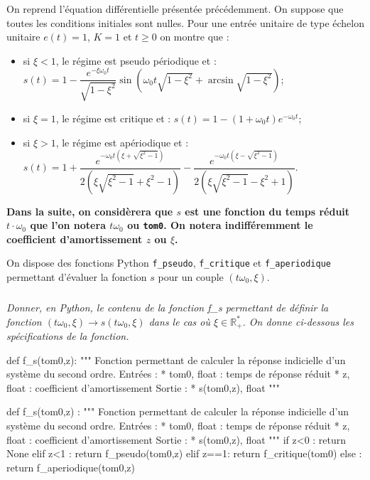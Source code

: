 \documentclass[10pt,fleqn]{article} %
\begin{document}
\ifprof
\else
On reprend l'équation différentielle présentée précédemment. On suppose que toutes les conditions initiales sont nulles. Pour une entrée unitaire de type échelon unitaire $e(t)=1$, $K=1$ et $t\geq0$ on montre que : 
\begin{itemize}
\item si $\xi <1$, le régime est pseudo périodique et :
$
s(t)=1-\dfrac{e^{-\xi\omega_0 t}}{\sqrt{1-\xi^2}}\sin\left(  \omega_0 t\sqrt{1-\xi^2}+\arcsin \sqrt{1-\xi^2} \right)
$;
\item si $\xi=1$, le régime est critique et : 
$
s(t)=1-\left(1+\omega_0 t \right)e^{-\omega_0 t} 
$;
\item si $\xi>1$, le régime est apériodique et : 
$
s(t)=1
+\dfrac{e^{- \omega_0 t\left( \xi + \sqrt{\xi^2-1}\right)}}{2\left(\xi\sqrt{\xi^2-1}+\xi^2-1 \right)}
-\dfrac{e^{- \omega_0 t \left( \xi - \sqrt{\xi^2-1}\right)}}{2\left(\xi\sqrt{\xi^2-1}-\xi^2+1 \right)}
$.
\end{itemize} 


\textbf{Dans la suite, on considèrera que $s$ est une fonction du temps réduit $t\cdot\omega_0$ que l'on notera $t\omega_0$ ou \texttt{tom0}. On notera indifféremment le coefficient d'amortissement $z$ ou $\xi$.}



\fi

\ifprof
\else
On dispose des fonctions Python \texttt{f\_pseudo}, \texttt{f\_critique} et \texttt{f\_aperiodique} permettant d'évaluer la fonction $s$ pour un couple $(t\omega_0,\xi)$.
\fi




\subparagraph{} \textit{Donner, en Python, le contenu de la fonction \textsf{f\_s} permettant de définir la fonction $(t\omega_0,\xi) \rightarrow s(t\omega_0,\xi)$ dans le cas où $\xi\in \mathbb{R}_+^*$. On donne ci-dessous les spécifications de la fonction.}
\ifprof
\else
\begin{py}
\begin{python}
def f_s(tom0,z):
    """
    Fonction permettant de calculer la réponse indicielle d'un système du second ordre. 
    Entrées : 
        * tom0, float : temps de réponse réduit
        * z, float : coefficient d'amortissement
    Sortie : 
        * s(tom0,z), float
    """
\end{python}
\end{py}
\fi


\ifprof
\begin{corrige}
\begin{py}
\begin{python}
def f_s(tom0,z) :
    """
    Fonction permettant de calculer la réponse indicielle d'un système du second ordre. 
    Entrées : 
        * tom0, float : temps de réponse réduit
        * z, float : coefficient d'amortissement
    Sortie : 
        * s(tom0,z), float
    """
    if z<0 :
        return None
    elif z<1 :
        return f_pseudo(tom0,z)
    elif z==1:
        return f_critique(tom0)
    else : 
        return f_aperiodique(tom0,z)
\end{python}
\end{py}
\end{corrige}
\else
\end{document}
